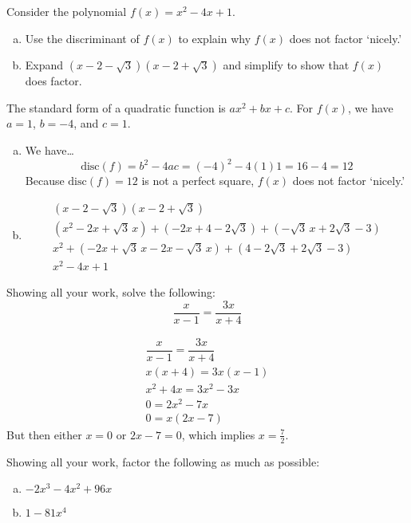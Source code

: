 \documentclass[12pt,letterpaper]{exam}
\begin{document}
\begin{questions}
\newpage
\question[10] Consider the polynomial $f(x)= x^2 - 4x + 1$.
	\begin{enumerate}[(a)]
	\item Use the discriminant of $f(x)$ to explain why $f(x)$ does not factor `nicely.' 
	\item Expand $(x - 2 - \sqrt{3})(x - 2 + \sqrt{3})$ and simplify to show that $f(x)$ does factor. 
	\end{enumerate} \pspace

\sol The standard form of a quadratic function is $ax^2 + bx + c$. For $f(x)$, we have $a= 1$, $b= -4$, and $c= 1$. \pspace

\begin{enumerate}[(a)]
\item We have\dots
	\[
	\text{disc}(f)= b^2 - 4ac= (-4)^2 - 4(1)1= 16 - 4= 12
	\]
Because $\text{disc}(f)= 12$ is not a perfect square, $f(x)$ does not factor `nicely.' \pspace

\item 
	\[
	\begin{gathered}
	(x - 2 - \sqrt{3})(x - 2 + \sqrt{3}) \\[0.3cm]
	(x^2 - 2x + \sqrt{3}\, x) + (-2x + 4 - 2\sqrt{3}) + (-\sqrt{3}\, x + 2 \sqrt{3} - 3) \\[0.3cm]
	x^2 + (-2x + \sqrt{3}\, x - 2x - \sqrt{3}\, x) + (4 - 2\sqrt{3} + 2 \sqrt{3} - 3) \\[0.3cm]
	x^2 - 4x + 1
	\end{gathered}
	\]
\end{enumerate}



\newpage
\question[10] Showing all your work, solve the following:
	\[
	\dfrac{x}{x - 1}= \dfrac{3x}{x + 4}
	\] \pspace

\sol 
	\[
	\begin{gathered}
	\dfrac{x}{x - 1}= \dfrac{3x}{x + 4} \\[0.3cm]
	x(x + 4)= 3x(x - 1) \\[0.3cm]
	x^2 + 4x= 3x^2 - 3x \\[0.3cm]
	0= 2x^2- 7x \\[0.3cm]
	0= x(2x - 7)
	\end{gathered}
	\] \pspace
But then either $x= 0$ or $2x - 7= 0$, which implies $x= \frac{7}{2}$. 



\newpage
\question[10] Showing all your work, factor the following as much as possible:
	\begin{enumerate}[(a)]
	\item $-2x^3 - 4x^2 + 96x$
	\item $1 - 81x^4$
	\end{enumerate} \pspace


\end{questions}
\end{document}
